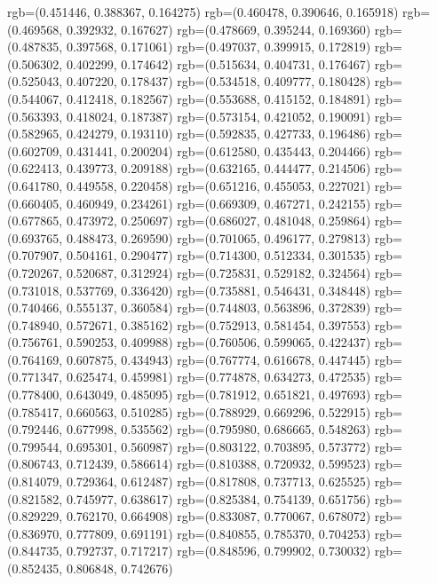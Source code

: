{{{					rgb=(0.451446, 0.388367, 0.164275)
					rgb=(0.460478, 0.390646, 0.165918)
					rgb=(0.469568, 0.392932, 0.167627)
					rgb=(0.478669, 0.395244, 0.169360)
					rgb=(0.487835, 0.397568, 0.171061)
					rgb=(0.497037, 0.399915, 0.172819)
					rgb=(0.506302, 0.402299, 0.174642)
					rgb=(0.515634, 0.404731, 0.176467)
					rgb=(0.525043, 0.407220, 0.178437)
					rgb=(0.534518, 0.409777, 0.180428)
					rgb=(0.544067, 0.412418, 0.182567)
					rgb=(0.553688, 0.415152, 0.184891)
					rgb=(0.563393, 0.418024, 0.187387)
					rgb=(0.573154, 0.421052, 0.190091)
					rgb=(0.582965, 0.424279, 0.193110)
					rgb=(0.592835, 0.427733, 0.196486)
					rgb=(0.602709, 0.431441, 0.200204)
					rgb=(0.612580, 0.435443, 0.204466)
					rgb=(0.622413, 0.439773, 0.209188)
					rgb=(0.632165, 0.444477, 0.214506)
					rgb=(0.641780, 0.449558, 0.220458)
					rgb=(0.651216, 0.455053, 0.227021)
					rgb=(0.660405, 0.460949, 0.234261)
					rgb=(0.669309, 0.467271, 0.242155)
					rgb=(0.677865, 0.473972, 0.250697)
					rgb=(0.686027, 0.481048, 0.259864)
					rgb=(0.693765, 0.488473, 0.269590)
					rgb=(0.701065, 0.496177, 0.279813)
					rgb=(0.707907, 0.504161, 0.290477)
					rgb=(0.714300, 0.512334, 0.301535)
					rgb=(0.720267, 0.520687, 0.312924)
					rgb=(0.725831, 0.529182, 0.324564)
					rgb=(0.731018, 0.537769, 0.336420)
					rgb=(0.735881, 0.546431, 0.348448)
					rgb=(0.740466, 0.555137, 0.360584)
					rgb=(0.744803, 0.563896, 0.372839)
					rgb=(0.748940, 0.572671, 0.385162)
					rgb=(0.752913, 0.581454, 0.397553)
					rgb=(0.756761, 0.590253, 0.409988)
					rgb=(0.760506, 0.599065, 0.422437)
					rgb=(0.764169, 0.607875, 0.434943)
					rgb=(0.767774, 0.616678, 0.447445)
					rgb=(0.771347, 0.625474, 0.459981)
					rgb=(0.774878, 0.634273, 0.472535)
					rgb=(0.778400, 0.643049, 0.485095)
					rgb=(0.781912, 0.651821, 0.497693)
					rgb=(0.785417, 0.660563, 0.510285)
					rgb=(0.788929, 0.669296, 0.522915)
					rgb=(0.792446, 0.677998, 0.535562)
					rgb=(0.795980, 0.686665, 0.548263)
					rgb=(0.799544, 0.695301, 0.560987)
					rgb=(0.803122, 0.703895, 0.573772)
					rgb=(0.806743, 0.712439, 0.586614)
					rgb=(0.810388, 0.720932, 0.599523)
					rgb=(0.814079, 0.729364, 0.612487)
					rgb=(0.817808, 0.737713, 0.625525)
					rgb=(0.821582, 0.745977, 0.638617)
					rgb=(0.825384, 0.754139, 0.651756)
					rgb=(0.829229, 0.762170, 0.664908)
					rgb=(0.833087, 0.770067, 0.678072)
					rgb=(0.836970, 0.777809, 0.691191)
					rgb=(0.840855, 0.785370, 0.704253)
					rgb=(0.844735, 0.792737, 0.717217)
					rgb=(0.848596, 0.799902, 0.730032)
					rgb=(0.852435, 0.806848, 0.742676)
}}}
